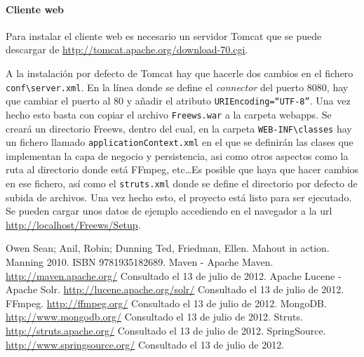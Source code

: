 \documentclass[11pt]{book}
\begin{document}
\paragraph{Cliente web}
Para instalar el cliente web es necesario un servidor Tomcat que se puede descargar de \url{http://tomcat.apache.org/download-70.cgi}.

A la instalación por defecto de Tomcat hay que hacerle dos cambios en el fichero \texttt{conf\textbackslash server.xml}. En la línea donde se define el \textit{connector} del puerto 8080, hay que cambiar el puerto al 80 y añadir el atributo \texttt{URIEncoding=``UTF-8''}. Una vez hecho esto basta con copiar el archivo \texttt{Freews.war} a la carpeta webapps. Se creará un directorio Freews, dentro del cual, en la carpeta \texttt{WEB-INF\textbackslash classes} hay un fichero llamado \texttt{applicationContext.xml} en el que se definirán las clases que implementan la capa de negocio y persistencia, asi como otros aspectos como la ruta al directorio donde está FFmpeg, etc\dots Es posible que haya que hacer cambios en ese fichero, así como el \texttt{struts.xml} donde se define el directorio por defecto de subida de archivos. Una vez hecho esto, el proyecto está listo para ser ejecutado. Se pueden cargar unos datos de ejemplo accediendo en el navegador a la url \url{http://localhost/Freews/Setup}.
\begin{thebibliography}{9}
 Owen Sean; Anil, Robin; Dunning Ted, Friedman, Ellen. Mahout in action. Manning 2010. ISBN 9781935182689.
 Maven - Apache Maven. \url{http://maven.apache.org/} Consultado el 13 de julio de 2012.
 Apache Lucene - Apache Solr. \url{http://lucene.apache.org/solr/} Consultado el 13 de julio de 2012.
 FFmpeg. \url{http://ffmpeg.org/} Consultado el 13 de julio de 2012.
 MongoDB. \url{http://www.mongodb.org/} Consultado el 13 de julio de 2012.
 Struts. \url{http://struts.apache.org/} Consultado el 13 de julio de 2012.
 SpringSource. \url{http://www.springsource.org/} Consultado el 13 de julio de 2012.
\end{thebibliography}

\newpage
\thispagestyle{empty}
\mbox{}
\end{document}
